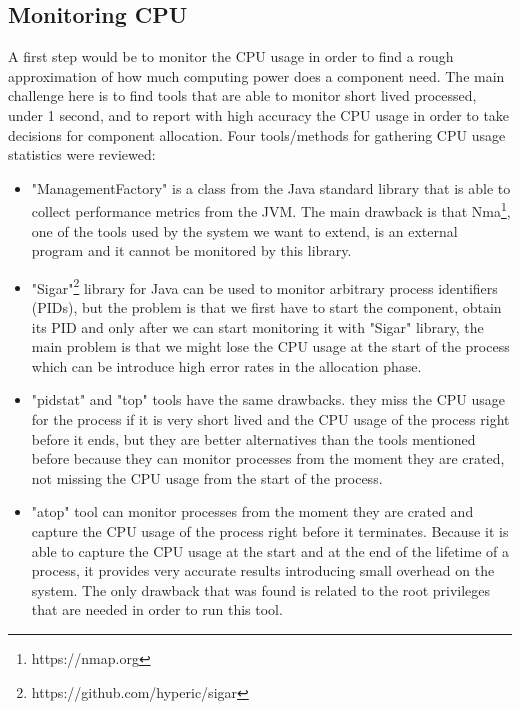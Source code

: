 \subsection{Monitoring CPU}
A first step would be to monitor the CPU usage in order to find a rough approximation of how much computing power does a component need. The main challenge here is to find tools that are able to monitor short lived processed, under 1 second, and to report with high accuracy the CPU usage in order to take decisions for component allocation. Four tools/methods for gathering CPU usage statistics were reviewed:  
\begin{itemize}
	\item "ManagementFactory" is a class from the Java standard library that is able to collect performance metrics from the JVM. The main drawback is that Nma\footnote{https://nmap.org}, one of the tools used by the system we want to extend, is an external program and it cannot be monitored by this library.
	\item "Sigar"\footnote{https://github.com/hyperic/sigar} library for Java can be used to monitor arbitrary process identifiers (PIDs), but the problem is that we first have to start the component, obtain its PID and only after we can start monitoring it with "Sigar" library, the main problem is that we might lose the CPU usage at the start of the process which can be introduce high error rates in the allocation phase.
	\item "pidstat" and "top" tools have the same drawbacks. they miss the CPU usage for the process if it is very short lived and the CPU usage of the process right before it ends, but they are better alternatives than the tools mentioned before because they can monitor processes from the moment they are crated, not missing the CPU usage from the start of the process.
	\item "atop" tool can monitor processes from the moment they are crated and capture the CPU usage of the process right before it terminates. Because it is able to capture the CPU usage at the start and at the end of the lifetime of a process, it provides very accurate results introducing small overhead on the system. The only drawback that was found is related to the root privileges that are needed in order to run this tool.
\end{itemize}
 
